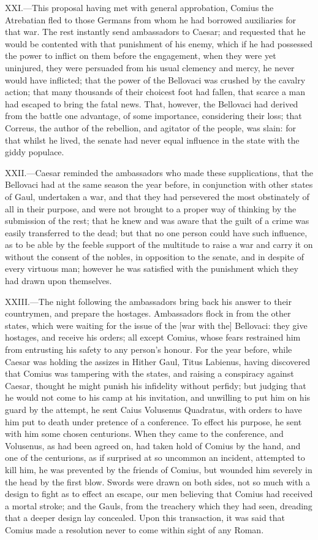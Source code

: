 XXI.—This proposal having met with general approbation, Comius the
Atrebatian fled to those Germans from whom he had borrowed auxiliaries
for that war. The rest instantly send ambassadors to Caesar; and
requested that he would be contented with that punishment of his enemy,
which if he had possessed the power to inflict on them before the
engagement, when they were yet uninjured, they were persuaded from his
usual clemency and mercy, he never would have inflicted; that the power
of the Bellovaci was crushed by the cavalry action; that many thousands
of their choicest foot had fallen, that scarce a man had escaped to
bring the fatal news. That, however, the Bellovaci had derived from the
battle one advantage, of some importance, considering their loss; that
Correus, the author of the rebellion, and agitator of the people, was
slain: for that whilst he lived, the senate had never equal influence in
the state with the giddy populace.

XXII.—Caesar reminded the ambassadors who made these supplications,
that the Bellovaci had at the same season the year before, in
conjunction with other states of Gaul, undertaken a war, and that they
had persevered the most obstinately of all in their purpose, and were
not brought to a proper way of thinking by the submission of the rest;
that he knew and was aware that the guilt of a crime was easily
transferred to the dead; but that no one person could have such
influence, as to be able by the feeble support of the multitude to raise
a war and carry it on without the consent of the nobles, in opposition
to the senate, and in despite of every virtuous man; however he was
satisfied with the punishment which they had drawn upon themselves.

XXIII.—The night following the ambassadors bring back his answer to
their countrymen, and prepare the hostages. Ambassadors flock in from
the other states, which were waiting for the issue of the [war with the]
Bellovaci: they give hostages, and receive his orders; all except
Comius, whose fears restrained him from entrusting his safety to any
person's honour. For the year before, while Caesar was holding the
assizes in Hither Gaul, Titus Labienus, having discovered that Comius
was tampering with the states, and raising a conspiracy against Caesar,
thought he might punish his infidelity without perfidy; but judging that
he would not come to his camp at his invitation, and unwilling to put
him on his guard by the attempt, he sent Caius Volusenus Quadratus, with
orders to have him put to death under pretence of a conference. To
effect his purpose, he sent with him some chosen centurions. When they
came to the conference, and Volusenus, as had been agreed on, had taken
hold of Comius by the hand, and one of the centurions, as if surprised
at so uncommon an incident, attempted to kill him, he was prevented by
the friends of Comius, but wounded him severely in the head by the first
blow. Swords were drawn on both sides, not so much with a design to
fight as to effect an escape, our men believing that Comius had received
a mortal stroke; and the Gauls, from the treachery which they had seen,
dreading that a deeper design lay concealed. Upon this transaction, it
was said that Comius made a resolution never to come within sight of any
Roman.

